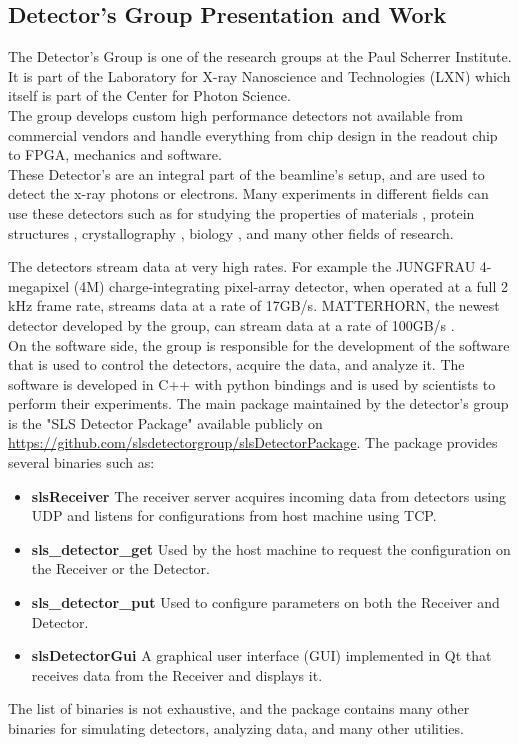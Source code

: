 \begin{spacing}{1.2}
    \section{Detector's Group Presentation and Work}
    The Detector's Group is one of the research groups at the Paul Scherrer Institute. It is part of the Laboratory for X-ray Nanoscience and Technologies (LXN) which itself
    is part of the Center for Photon Science.\\

    The group develops custom high performance detectors not available from commercial vendors and handle everything
    from chip design in the readout chip to FPGA, mechanics and software.\\

    These Detector's are an integral part of the beamline's setup, and are used to detect the x-ray photons or electrons. Many experiments in different
    fields can use these detectors such as for studying the properties of
    materials \cite{butcher2024ptychographic},
    protein structures \cite{pomeranz2009crystal}, crystallography \cite{leonarski2023kilohertz}, biology \cite{lemcoff2023brilliant,dullin2024vivo}, and many other fields of research.


    The detectors stream data at very high rates. For example the JUNGFRAU 4-megapixel (4M)
    charge-integrating pixel-array detector, when operated at a full 2 kHz frame rate,
    streams data at a rate of 17GB/s. MATTERHORN, the newest detector developed by the group,
    can stream data at a rate of 100GB/s \cite{matterhorn, Jungfraujoch}.\\

    On the software side, the group is responsible for the development of the software that is used to control the detectors, acquire the data, and analyze it.
    The software is developed in C++ with python bindings and is used by scientists to perform their experiments.
    The main package maintained by the detector's group is the "SLS Detector Package" available publicly
    on \url{https://github.com/slsdetectorgroup/slsDetectorPackage}. The package provides several binaries such as:
    \begin{itemize}
        \item \textbf{slsReceiver} The receiver server acquires incoming data from detectors using UDP and listens for configurations from host machine using TCP.
        \item \textbf{sls\_detector\_get} Used by the host machine to request the configuration on the Receiver or the Detector.
        \item \textbf{sls\_detector\_put} Used to configure parameters on both the Receiver and Detector.
        \item \textbf{slsDetectorGui} A graphical user interface (GUI) implemented in Qt that receives data from the Receiver and displays it.
    \end{itemize}
    The list of binaries is not exhaustive, and the package contains many other binaries for simulating detectors, analyzing data, and many other utilities.


\end{spacing}
